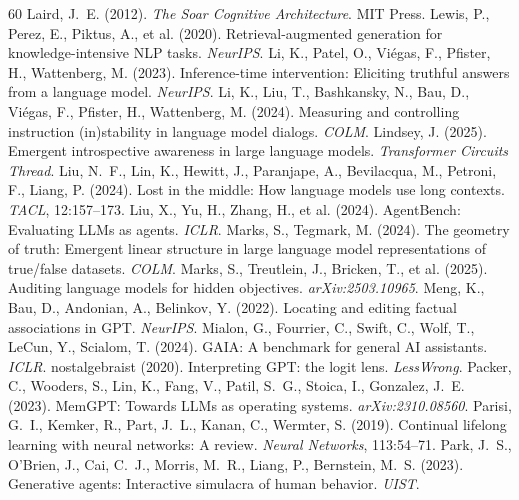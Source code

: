 \documentclass[11pt]{article}
\begin{document}
\begin{thebibliography}{60}
 Laird, J.~E. (2012). \emph{The Soar Cognitive Architecture}. MIT Press.
 Lewis, P., Perez, E., Piktus, A., et al. (2020). Retrieval-augmented generation for knowledge-intensive NLP tasks. \emph{NeurIPS}.
 Li, K., Patel, O., Vi\'egas, F., Pfister, H., Wattenberg, M. (2023). Inference-time intervention: Eliciting truthful answers from a language model. \emph{NeurIPS}.
 Li, K., Liu, T., Bashkansky, N., Bau, D., Vi\'egas, F., Pfister, H., Wattenberg, M. (2024). Measuring and controlling instruction (in)stability in language model dialogs. \emph{COLM}.
 Lindsey, J. (2025). Emergent introspective awareness in large language models. \emph{Transformer Circuits Thread}.
 Liu, N.~F., Lin, K., Hewitt, J., Paranjape, A., Bevilacqua, M., Petroni, F., Liang, P. (2024). Lost in the middle: How language models use long contexts. \emph{TACL}, 12:157--173.
 Liu, X., Yu, H., Zhang, H., et al. (2024). AgentBench: Evaluating LLMs as agents. \emph{ICLR}.
 Marks, S., Tegmark, M. (2024). The geometry of truth: Emergent linear structure in large language model representations of true/false datasets. \emph{COLM}.
 Marks, S., Treutlein, J., Bricken, T., et al. (2025). Auditing language models for hidden objectives. \emph{arXiv:2503.10965}.
 Meng, K., Bau, D., Andonian, A., Belinkov, Y. (2022). Locating and editing factual associations in GPT. \emph{NeurIPS}.
 Mialon, G., Fourrier, C., Swift, C., Wolf, T., LeCun, Y., Scialom, T. (2024). GAIA: A benchmark for general AI assistants. \emph{ICLR}.
 nostalgebraist (2020). Interpreting GPT: the logit lens. \emph{LessWrong}.
 Packer, C., Wooders, S., Lin, K., Fang, V., Patil, S.~G., Stoica, I., Gonzalez, J.~E. (2023). MemGPT: Towards LLMs as operating systems. \emph{arXiv:2310.08560}.
 Parisi, G.~I., Kemker, R., Part, J.~L., Kanan, C., Wermter, S. (2019). Continual lifelong learning with neural networks: A review. \emph{Neural Networks}, 113:54--71.
 Park, J.~S., O'Brien, J., Cai, C.~J., Morris, M.~R., Liang, P., Bernstein, M.~S. (2023). Generative agents: Interactive simulacra of human behavior. \emph{UIST}.

\end{thebibliography}
\end{document}
